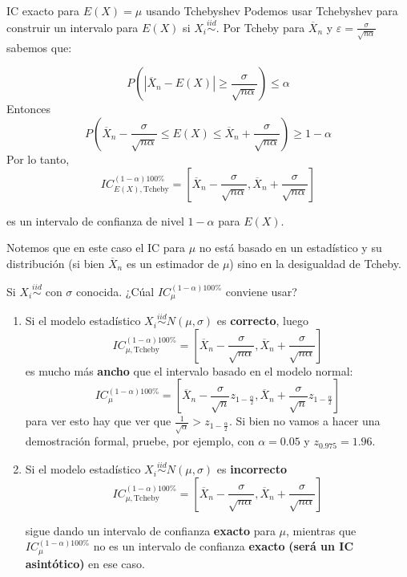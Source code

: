 \documentclass{beamer}
\theoremstyle{definition}
\newcommand{\eps}{\varepsilon}
\begin{document}
\begin{frame}{\color{rosee}IC exacto para $E(X)=\mu$ usando Tchebyshev}\small
Podemos usar Tchebyshev para construir un intervalo para $E(X)$ si $X_i\stackrel{iid}{\sim}$. Por Tcheby para $\overline{X}_n$ y $\eps=\frac{\sigma}{\sqrt{n\alpha}}$ sabemos que:

$$
P\left( \left\vert \overline{X}_{n}-E(X)\right\vert\geq \frac{\sigma}{\sqrt{n\alpha}}\right)\leq \alpha
$$
Entonces 
$$
P\left(  \overline{X}_{n}-\frac{\sigma}{\sqrt{n\alpha}}\leq E(X) \leq  \overline{X}_{n}+\frac{\sigma}{\sqrt{n\alpha}}\right)\geq 1-\alpha
$$
Por lo tanto,
$$
IC_{E(X),\text{Tcheby}}^{(1-\alpha)100\%}=\left[\overline{X}_{n} -\frac{\sigma}{\sqrt{n\alpha}},\overline{X}_{n} + \frac{\sigma}{\sqrt{n\alpha}}\right]
$$

es un intervalo de confianza de nivel $1-\alpha$ para $E(X)$.

\medskip

Notemos que en este caso el IC para $\mu$ no está basado en un estadístico y su distribución (si bien $\overline{X}_n$ es un estimador de $\mu$) sino en la desigualdad de Tcheby. 
\end{frame}


\begin{frame}{\color{rosee} Si $X_i\stackrel{iid}{\sim}$ con $\sigma$ conocida. ¿Cúal $IC_{\mu}^{(1-\alpha)100\%}$ conviene usar?}
\small
\begin{enumerate}
\item Si el modelo estadístico $X_i\stackrel{iid}{\sim} N(\mu,\sigma)$ es \textbf{correcto}, luego 
$$
IC_{\mu, \text{Tcheby}}^{(1-\alpha)100\%}=\left[\overline{X}_{n} -\frac{\sigma}{\sqrt{n\alpha}},\overline{X}_{n} + \frac{\sigma}{\sqrt{n\alpha}}\right]
$$
es mucho más \textbf{ancho} que el intervalo basado en el modelo normal:
$$
IC_{\mu}^{(1-\alpha)100\%}=\left[\overline{X}_{n} - \frac{\sigma}{\sqrt{n}}z_{1-\frac{\alpha}{2}},\overline{X}_{n} + \frac{\sigma}{\sqrt{n}}z_{1-\frac{\alpha}{2}}\right]
$$
\color{gray} para ver esto hay que ver que $\frac{1}{\sqrt{\alpha}}>z_{1-\frac{\alpha}{2}}$. Si bien no vamos a hacer una demostración formal, pruebe, por ejemplo, con $\alpha=0.05$ y $z_{0.975}=1.96$. \color{black}
\item  Si el modelo estadístico $X_i\stackrel{iid}{\sim} N(\mu,\sigma)$ es \textbf{incorrecto}
$$
IC_{\mu, \text{Tcheby}}^{(1-\alpha)100\%}=\left[\overline{X}_{n} -\frac{\sigma}{\sqrt{n\alpha}},\overline{X}_{n} +\frac{\sigma}{\sqrt{n\alpha}}\right]
$$

sigue dando un intervalo de confianza \textbf{exacto} para $\mu$, mientras que $IC_{\mu}^{(1-\alpha)100\%}$ no es un intervalo de confianza \textbf{exacto} \textbf{(será un IC asintótico)} en ese caso.
\end{enumerate}
\end{frame}
\end{document}
